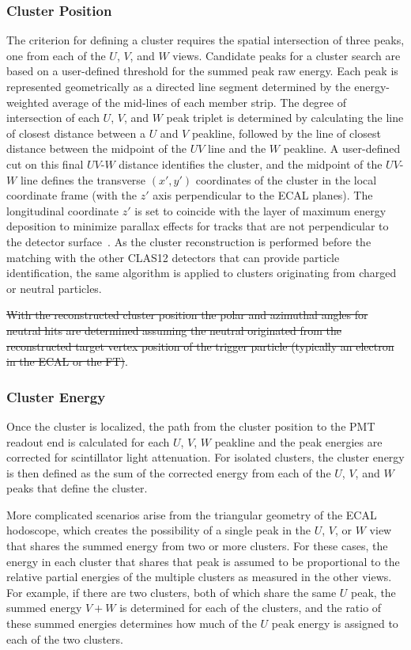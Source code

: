 \subsubsection {Cluster Position}
\label{ec-cluster}

The criterion for defining a cluster requires the spatial intersection of three peaks, one from each of the $U$,
$V$, and $W$ views. Candidate peaks for a cluster search are based on a user-defined threshold for the
summed peak raw energy. Each peak is represented geometrically as a directed line segment determined by the
energy-weighted average of the mid-lines of each member strip. The degree of intersection of each $U$, $V$,
and $W$ peak triplet is determined by calculating the line of closest distance between a $U$ and $V$ peakline,
followed by the line of closest distance between the midpoint of the $UV$ line and the $W$ peakline. A
user-defined cut on this final $UV$-$W$ distance identifies the cluster, and the midpoint of the $UV$-$W$
line defines the transverse $(x',y')$ coordinates of the cluster in the local coordinate frame (with the $z'$
axis perpendicular to the ECAL planes). The longitudinal coordinate $z'$ is set to coincide with the layer of
maximum energy deposition to minimize parallax effects for tracks that are not perpendicular to the detector
surface~\cite{ecal-nim}. As the cluster reconstruction is performed before the matching with the other CLAS12
detectors that can provide particle identification, the same algorithm is applied to clusters originating from
charged or neutral particles.

{\color{red}\sout{With the reconstructed cluster position the polar and azimuthal angles for neutral hits are determined assuming
the neutral originated from the reconstructed target vertex position of the trigger particle (typically an electron
in the ECAL or the FT)}}.

\subsubsection {Cluster Energy}

Once the cluster is localized, the path from the cluster position to the PMT readout end is calculated for each $U$,
$V$, $W$ peakline and the peak energies are corrected for scintillator light attenuation. For isolated clusters,
the cluster energy is then defined as the sum of the corrected energy from each of the $U$, $V$, and $W$ peaks
that define the cluster.

More complicated scenarios arise from the triangular geometry of the ECAL hodoscope, which creates the
possibility of a single peak in the $U$, $V$, or $W$ view that shares the summed energy from two or more
clusters. For these cases, the energy in each cluster that shares that peak is assumed to be proportional to the
relative partial energies of the multiple clusters as measured in the other views. For example, if there are two
clusters, both of which share the same $U$ peak, the summed energy $V+W$ is determined for each of the
clusters, and the ratio of these summed energies determines how much of the $U$ peak energy is assigned to
each of the two clusters.


